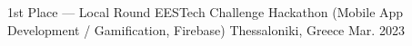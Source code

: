 

\begin{cvhonors}

  \cvhonor
    {1st Place --- Local Round} %
    {EESTech Challenge Hackathon (Mobile App Development / Gamification, Firebase)} %
    {Thessaloniki, Greece} %
    {Mar. 2023} %

\end{cvhonors}
